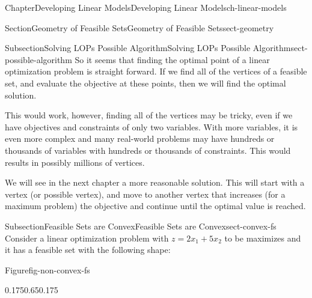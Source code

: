 \documentclass[oneside,10pt,]{book}
\numberwithin{equation}{section}
\begin{document}
\begin{chapterptx}{Chapter}{Developing Linear Models}{}{Developing Linear Models}{}{}{ch-linear-models}
\begin{sectionptx}{Section}{Geometry of Feasible Sets}{}{Geometry of Feasible Sets}{}{}{sect-geometry}
%
%
\typeout{************************************************}
\typeout{************************************************}
%
\begin{subsectionptx}{Subsection}{Solving LOPs \textemdash{} Possible Algorithm}{}{Solving LOPs \textemdash{} Possible Algorithm}{}{}{sect-possible-algorithm}
So it seems that finding the optimal point of a linear optimization problem is straight forward. If we find all of the vertices of a feasible set, and evaluate the objective at these points, then we will find the optimal solution.%
\par
This would work, however, finding all of the vertices may be tricky, even if we have objectives and constraints of only two variables. With more variables, it is even more complex and many real-world problems may have hundreds or thousands of variables with hundreds or thousands of constraints. This would results in possibly millions of vertices.%
\par
We will see in the next chapter a more reasonable solution. This will start with a vertex (or possible vertex), and move to another vertex that increases (for a maximum problem) the objective and continue until the optimal value is reached.%
\end{subsectionptx}
%
%
\typeout{************************************************}
\typeout{************************************************}
%
\begin{subsectionptx}{Subsection}{Feasible Sets are Convex}{}{Feasible Sets are Convex}{}{}{sect-convex-fs}
Consider a linear optimization problem with \(z=2x_1+5x_2\) to be maximizes and it has a feasible set with the following shape:%
\begin{figureptx}{Figure}{}{fig-non-convex-fs}{}%
\begin{image}{0.175}{0.65}{0.175}{}%
%
\end{image}%
\tcblower
\end{figureptx}%

\end{subsectionptx}
\end{sectionptx}
\end{chapterptx}
\end{document}
